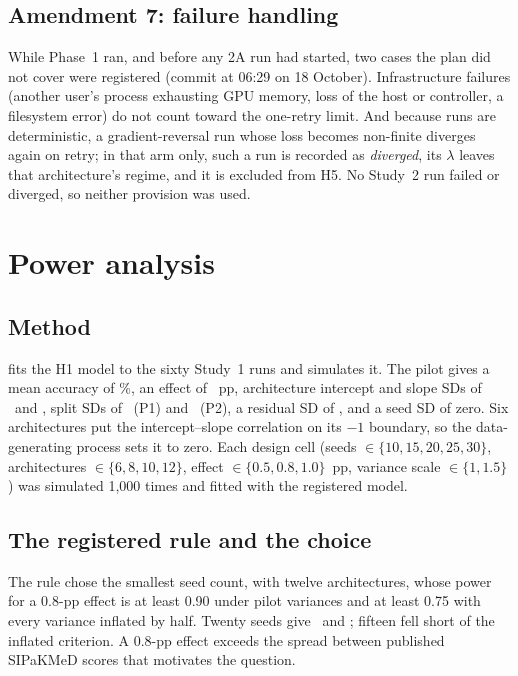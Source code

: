 \section{Amendment 7: failure handling}

While Phase~1 ran, and before any 2A run had started, two cases the plan did not cover were registered (commit at 06:29
on 18 October). Infrastructure failures (another user's process exhausting GPU memory, loss of the host or controller, a
filesystem error) do not count toward the one-retry limit. And because runs are deterministic, a gradient-reversal run
whose loss becomes non-finite diverges again on retry; in that arm only, such a run is recorded as \emph{diverged}, its
$\lambda$ leaves that architecture's regime, and it is excluded from H5. No Study~2 run failed or diverged, so neither
provision was used.

\chapter{Power analysis}
\label{r:ch:power}

\section{Method}

 fits the H1 model to the sixty Study~1 runs and simulates it. The pilot
gives a mean accuracy of \RecPilotMu\%, an effect of \PilotEst~pp, architecture intercept and slope SDs of
\RecPilotSdInt\ and \RecPilotSdSlope, split SDs of \RecPilotSdSplitOne\ (P1) and \RecPilotSdSplitTwo\ (P2), a residual SD
of \RecPilotSdResid, and a seed SD of zero. Six architectures put the intercept--slope correlation on its $-1$ boundary,
so the data-generating process sets it to zero. Each design cell (seeds $\in\{10,15,20,25,30\}$, architectures $\in\{6,8,10,12\}$,
effect $\in\{0.5,0.8,1.0\}$~pp, variance scale $\in\{1, 1.5\}$) was simulated 1,000 times and fitted with the registered model.

\section{The registered rule and the choice}

The rule chose the smallest seed count, with twelve architectures, whose power for a 0.8-pp effect is at least 0.90
under pilot variances and at least 0.75 with every variance inflated by half. Twenty seeds give \PowerChosen\ and
\PowerInflated; fifteen fell short of the inflated criterion. A 0.8-pp effect exceeds the spread between published
SIPaKMeD scores that motivates the question.

